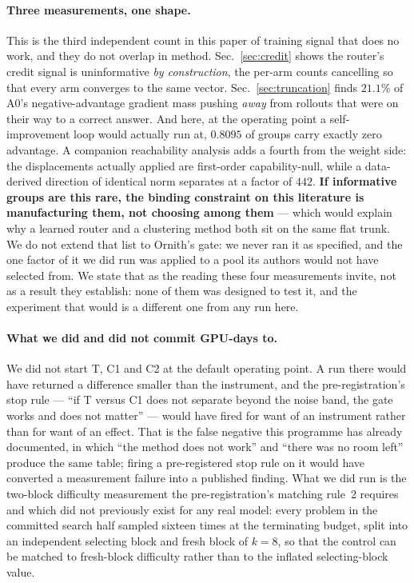 \paragraph{Three measurements, one shape.} This is the third independent count in this paper of
training signal that does no work, and they do not overlap in method.
Sec.~\ref{sec:credit} shows the router's credit signal is uninformative \emph{by construction},
the per-arm counts cancelling so that every arm converges to the same vector.
Sec.~\ref{sec:truncation} finds $21.1\%$ of A0's negative-advantage gradient mass pushing
\emph{away} from rollouts that were on their way to a correct answer. And here, at the
operating point a self-improvement loop would actually run at, $0.8095$ of groups carry exactly
zero advantage. A companion reachability analysis adds a fourth from the weight side: the
displacements actually applied are first-order capability-null, while a data-derived direction
of identical norm separates at a factor of $442$. \textbf{If informative groups are this rare,
the binding constraint on this literature is manufacturing them, not choosing among them} ---
which would explain why a learned router and a clustering method both sit on the same flat
trunk. We do not extend that list to Ornith's gate: we never ran it as specified, and the one
factor of it we did run was applied to a pool its authors would not have selected from. We state that as the reading these four measurements invite,
not as a result they establish: none of them was designed to test it, and the experiment that
would is a different one from any run here.

\paragraph{What we did and did not commit GPU-days to.} We did not start T, C1 and C2 at the
default operating point. A run there would have returned a difference smaller than the
instrument, and the pre-registration's stop rule --- ``if T versus C1 does not separate beyond
the noise band, the gate works and does not matter'' --- would have fired for want of an
instrument rather than for want of an effect. That is the false negative this programme has
already documented, in which ``the method does not work'' and ``there was no room left''
produce the same table; firing a pre-registered stop rule on it would have converted a
measurement failure into a published finding. What we did run is the two-block difficulty
measurement the pre-registration's matching rule~2 requires and which did not previously exist
for any real model: every problem in the committed search half sampled sixteen times at the
terminating budget, split into an independent selecting block and fresh block of $k=8$, so
that the control can be matched to fresh-block difficulty rather than to the inflated
selecting-block value.
